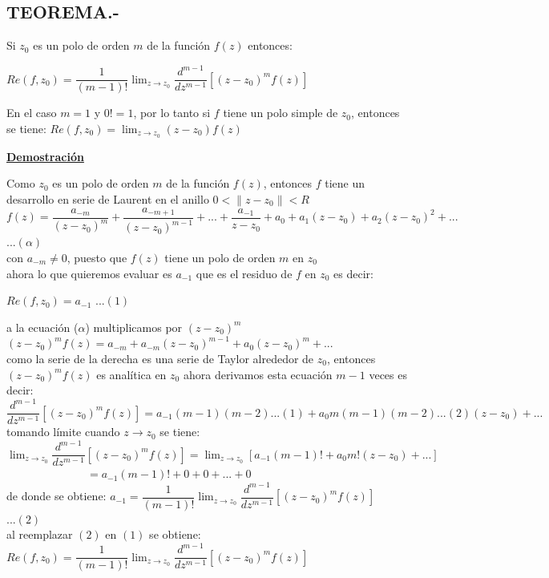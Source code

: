 \documentclass[10pt,a4paper]{article}
\begin{document}
\subsection{TEOREMA.-}
Si $z_0$ es un polo de orden $m$ de la función $f(z)$ entonces: \\
\begin{center}
$\displaystyle{Re(f,z_0) = \dfrac{1}{(m-1)!} \lim_{z \to z_0} \dfrac{d^{m-1}}{dz^{m-1}}[(z-z_0)^m f(z)]}$
\end{center}
En el caso $m = 1$ y $0! = 1$, por lo tanto si $f$ tiene un polo simple de $z_0$, entonces se tiene: $\displaystyle{Re(f,z_0) = \lim_{z \to z_0}(z-z_0) f(z)}$
\begin{center}
\textbf{\underline{Demostración}}
\end{center}
Como $z_0$ es un polo de orden $m$ de la función $f(z)$, entonces $f$ tiene un desarrollo en serie de Laurent en el anillo $0 < \parallel z - z_0 \parallel < R $\\
$\displaystyle{f(z) = \dfrac{a_{-m}}{(z-z_0)^m} + \dfrac{a_{-m+1}}{(z-z_0)^{m-1}} + ... + \dfrac{a_{-1}}{z-z_0} + a_0 + a_1(z-z_0) + a_2 (z-z_0)^2 + ...  }$   $... (\alpha)$ \\
con $a_{-m} \neq 0$, puesto que $f(z)$ tiene un polo de orden $m$ en $z_0$ \\
ahora lo que quieremos evaluar es $a_{-1}$ que es el residuo de $f$ en $z_0$ es decir: \\
\begin{center}
$Re(f,z_0) = a_{-1}$           \hspace{2cm}    $...(1)$
\end{center}
a la ecuación ($\alpha$) multiplicamos por $(z-z_0)^m$ \\
$(z-z_0)^m f(z) = a_{-m} + a_{-m} (z - z_0)^{m-1} + a_0 (z-z_0)^m + ...$\\
como la serie de la derecha es una serie de Taylor alrededor de $z_0$, entonces $(z-z_0)^m f(z)$ es analítica en $z_0$ ahora derivamos esta ecuación $m-1$ veces es decir: \\
$\displaystyle{\dfrac{d^{m-1}}{dz^{m-1}} [(z-z_0)^m f(z)] = a_{-1} (m-1)(m-2)...(1) + a_0 m (m-1)(m-2)...(2)(z-z_0) + ...}$\\
tomando límite cuando $z \to z_0$ se tiene:\\
$\displaystyle{ \lim_{z \to z_0} \dfrac{d^{m-1}}{dz^{m-1}} [(z-z_0)^m f(z)] =  \lim_{z \to z_0} [a_{-1} (m-1)! + a_0 m!(z-z_0) + ...]}$ 
$\hspace{3cm} =a_{-1}(m-1)! + 0 +0+...+0$\\
de donde se obtiene: $\displaystyle{a_{-1} = \dfrac{1}{(m-1)!} \lim_{z \to z_0} \dfrac{d^{m-1}}{dz^{m-1}} [(z-z_0)^m f(z)]}$ \hspace{1.5cm} $...(2)$\\
al reemplazar $(2)$ en $(1)$ se obtiene: \\
$\displaystyle{Re(f,z_0) = \dfrac{1}{(m-1)!}  \lim_{z \to z_0} \dfrac{d^{m-1}}{dz^{m-1}} [(z-z_0)^m f(z)]}$
\end{document}
